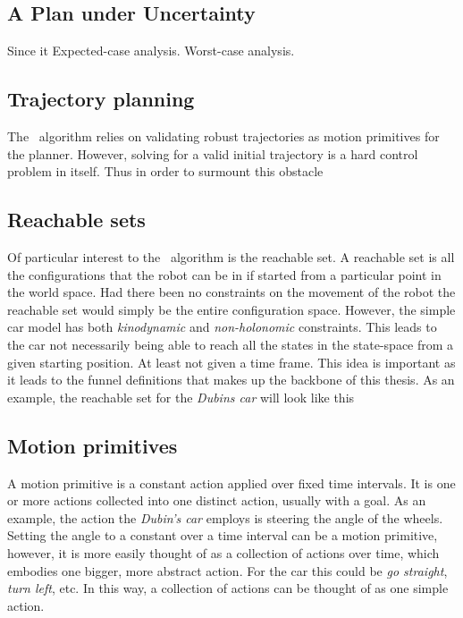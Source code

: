 \subsection{A Plan under Uncertainty}
Since it Expected-case analysis. Worst-case analysis.

\subsection{Trajectory planning}

The \rrtfunnel\ algorithm relies on validating robust trajectories as motion
primitives for the planner. However, solving for a valid initial trajectory is a
hard control problem in itself. Thus in order to surmount this obstacle

\subsection{Reachable sets}

Of particular interest to the \rrtfunnel\ algorithm is the reachable set. A
reachable set is all the configurations that the robot can be in if started from
a particular point in the world space. Had there been no constraints on the
movement of the robot the reachable set would simply be the entire configuration
space. However, the simple car model has both \textit{kinodynamic} and
\textit{non-holonomic} constraints. This leads to the car not necessarily being
able to reach all the states in the state-space from a given starting position.
At least not given a time frame. This idea is important as it leads to the
funnel definitions that makes up the backbone of this thesis. As an example, the
reachable set for the \textit{Dubins car} will look like this

\begin{figure}
\begin{centering}
  
\end{centering}
\end{figure}

\subsection{Motion primitives}

A motion primitive is a constant action applied over fixed time intervals. It is
one or more actions collected into one distinct action, usually with a goal. As
an example, the action the \textit{Dubin's car} employs is steering the angle of
the wheels. Setting the angle to a constant over a time interval can be a motion
primitive, however, it is more easily thought of as a collection of actions over
time, which embodies one bigger, more abstract action. For the car this could be
\textit{go straight}, \textit{turn left}, etc. In this way, a collection of
actions can be thought of as one simple action.

